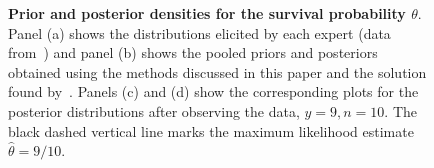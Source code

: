 \documentclass[12pt]{article}
\begin{document}
\begin{figure}[!ht]
\begin{center}
\end{center}
\caption{\textbf{Prior and posterior densities for the survival probability $\theta$}.
Panel (a) shows the distributions elicited by each expert (data from~\textcite{Savchuk1994}) and panel (b) shows the pooled priors and posteriors obtained using the methods discussed in this paper and the solution found by~\textcite{Rufo2012B}.
Panels (c) and (d) show the corresponding plots for the posterior distributions after observing the data, $y = 9, n = 10$.
The black dashed vertical line marks the maximum likelihood estimate $\hat{\theta}= 9/10$.
}
\label{fig:priors_pooled_Savchuk}
\end{figure}
\end{document}
